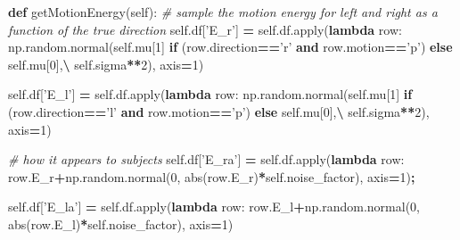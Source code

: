 \documentclass[12pt,twoside]{reedthesis}
\newenvironment{Shaded}{\begin{snugshade}}{\end{snugshade}}
\newcommand{\BuiltInTok}[1]{#1}
\newcommand{\CommentTok}[1]{\textcolor[rgb]{0.56,0.35,0.01}{\textit{#1}}}
\newcommand{\ControlFlowTok}[1]{\textcolor[rgb]{0.13,0.29,0.53}{\textbf{#1}}}
\newcommand{\DecValTok}[1]{\textcolor[rgb]{0.00,0.00,0.81}{#1}}
\newcommand{\KeywordTok}[1]{\textcolor[rgb]{0.13,0.29,0.53}{\textbf{#1}}}
\newcommand{\NormalTok}[1]{#1}
\newcommand{\OperatorTok}[1]{\textcolor[rgb]{0.81,0.36,0.00}{\textbf{#1}}}
\newcommand{\StringTok}[1]{\textcolor[rgb]{0.31,0.60,0.02}{#1}}
\newcommand{\VariableTok}[1]{\textcolor[rgb]{0.00,0.00,0.00}{#1}}
\begin{document}
\begin{Shaded}
\begin{Highlighting}[]
    \KeywordTok{def}\NormalTok{ getMotionEnergy(}\VariableTok{self}\NormalTok{):}
     \CommentTok{# sample the motion energy for left and right as a function of the true direction}
        \VariableTok{self}\NormalTok{.df[}\StringTok{'E_r'}\NormalTok{] }\OperatorTok{=} \VariableTok{self}\NormalTok{.df.}\BuiltInTok{apply}\NormalTok{(}\KeywordTok{lambda}\NormalTok{ row: np.random.normal(}\VariableTok{self}\NormalTok{.mu[}\DecValTok{1}\NormalTok{] }\ControlFlowTok{if}\NormalTok{ (row.direction}\OperatorTok{==}\StringTok{'r'} \KeywordTok{and}\NormalTok{ row.motion}\OperatorTok{==}\StringTok{'p'}\NormalTok{) }\ControlFlowTok{else} \VariableTok{self}\NormalTok{.mu[}\DecValTok{0}\NormalTok{],}\OperatorTok{\textbackslash{}}
                               \VariableTok{self}\NormalTok{.sigma}\OperatorTok{**}\DecValTok{2}\NormalTok{), axis}\OperatorTok{=}\DecValTok{1}\NormalTok{)}

        \VariableTok{self}\NormalTok{.df[}\StringTok{'E_l'}\NormalTok{] }\OperatorTok{=} \VariableTok{self}\NormalTok{.df.}\BuiltInTok{apply}\NormalTok{(}\KeywordTok{lambda}\NormalTok{ row: np.random.normal(}\VariableTok{self}\NormalTok{.mu[}\DecValTok{1}\NormalTok{] }\ControlFlowTok{if}\NormalTok{ (row.direction}\OperatorTok{==}\StringTok{'l'} \KeywordTok{and}\NormalTok{ row.motion}\OperatorTok{==}\StringTok{'p'}\NormalTok{) }\ControlFlowTok{else} \VariableTok{self}\NormalTok{.mu[}\DecValTok{0}\NormalTok{],}\OperatorTok{\textbackslash{}}
                               \VariableTok{self}\NormalTok{.sigma}\OperatorTok{**}\DecValTok{2}\NormalTok{), axis}\OperatorTok{=}\DecValTok{1}\NormalTok{)}

    \CommentTok{# how it appears to subjects}
        \VariableTok{self}\NormalTok{.df[}\StringTok{'E_ra'}\NormalTok{] }\OperatorTok{=} \VariableTok{self}\NormalTok{.df.}\BuiltInTok{apply}\NormalTok{(}\KeywordTok{lambda}\NormalTok{ row: row.E_r}\OperatorTok{+}\NormalTok{np.random.normal(}\DecValTok{0}\NormalTok{, }\BuiltInTok{abs}\NormalTok{(row.E_r)}\OperatorTok{*}\VariableTok{self}\NormalTok{.noise_factor), axis}\OperatorTok{=}\DecValTok{1}\NormalTok{)}\OperatorTok{;}

        \VariableTok{self}\NormalTok{.df[}\StringTok{'E_la'}\NormalTok{] }\OperatorTok{=} \VariableTok{self}\NormalTok{.df.}\BuiltInTok{apply}\NormalTok{(}\KeywordTok{lambda}\NormalTok{ row: row.E_l}\OperatorTok{+}\NormalTok{np.random.normal(}\DecValTok{0}\NormalTok{, }\BuiltInTok{abs}\NormalTok{(row.E_l)}\OperatorTok{*}\VariableTok{self}\NormalTok{.noise_factor), axis}\OperatorTok{=}\DecValTok{1}\NormalTok{)}
    

\end{Highlighting}
\end{Shaded}
\end{document}
